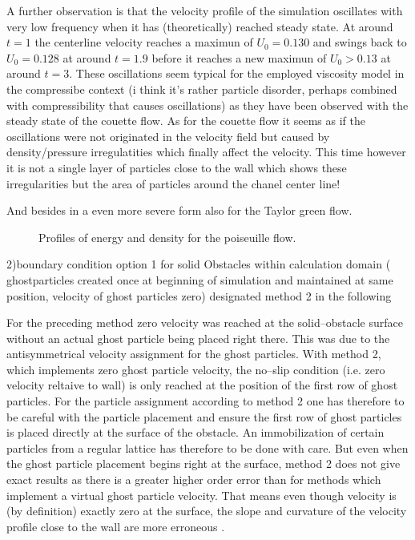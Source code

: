 \documentclass{report}
\begin{document}
A further observation is that the velocity profile of the simulation oscillates with very low frequency when it has (theoretically) reached steady state. At around $t=1$ the centerline velocity reaches a maximun of $U_0=0.130$ and swings back to $U_0=0.128$ at around $t=1.9$ before it reaches a new maximun of $U_0>0.13$ at around $t=3$. These oscillations seem typical for the employed viscosity model in the compressibe context (i think it's rather particle disorder, perhaps combined with compressibility that causes oscillations) as they have been observed with the steady state of the couette flow. As for the couette flow it seems as if the oscillations were not originated in the velocity field but caused by density/pressure irregulatities which finally affect the velocity. This time however it is not a single layer of particles close to the wall which shows these irregularities but the area of particles around the chanel center line!

And besides in a even more severe form also for the Taylor green flow.

  
\begin{figure}[!htbp]
\centering
\label{fig:Porosities_LinearWall_domainEdgeBC_EnergyDensity}
\subfigure[energy]{
\label{fig:Porosities_LinearWall_domainEdgeBC_Energy}
}
\subfigure[density]{
\label{fig:Porosities_LinearWall_domainEdgeBC_tDensity}
}

\caption[Energy and Density Profiles Poiseuille]{Profiles of energy and density for the poiseuille flow.}

\end{figure}



 
2)boundary condition option 1 for solid Obstacles within calculation domain
( ghostparticles created once at beginning of simulation and maintained at same position, velocity of ghost particles zero) designated method 2 in the following

For the preceding method zero velocity was reached at the solid--obstacle surface without
an actual ghost particle being placed right there. This was due to the antisymmetrical velocity assignment for the ghost particles. With method 2, which implements zero ghost particle velocity, the no--slip condition (i.e. zero velocity reltaive to wall) is only reached at the position of the first row of ghost particles. For the particle assignment according to method 2 one has therefore to be careful with the particle placement and ensure the first row of ghost particles is placed directly at the surface of the obstacle. An immobilization of certain particles from a regular lattice has therefore to be done with care. But even when the ghost particle placement begins right at the surface, method 2 does not give exact results as there is a greater higher order error than for methods which implement a virtual ghost particle velocity. That means even though velocity is (by definition) exactly zero at the surface, the slope and curvature of the velocity profile close to the wall are more erroneous \cite{Morris1997, Basa2009}. 
\end{document}
